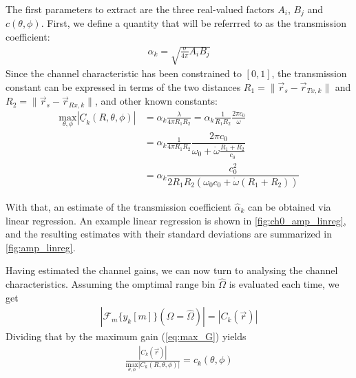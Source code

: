 The first parameters to extract are the three real-valued factors $A_i$, $B_j$ and $c(\theta,\phi)$.
First, we define a quantity that will be referrred to as the transmission coefficient:
\begin{align}
  \alpha_k = \sqrt{\frac{\sigma}{4\pi}A_iB_j}
\end{align}
Since the channel characteristic has been constrained to $[0,1]$,
the transmission constant can be expressed in terms of the two distances
$R_1 = \|\vec r_s - \vec r_{Tx,k}\|$ and $R_2 = \|\vec r_s - \vec r_{Rx,k}\|$, and other known constants: \\
\begin{align}
  \underset{\theta,\phi}{\text{max}} |\underline C_k(R,\theta,\phi)|
   & = \alpha_k\frac{\lambda}{4\pi R_1R_2} = \alpha_k \frac{1}{R_1R_2} \frac {2\pi c_0}{\omega}          \\
   & = \alpha_k \frac{1}{4\pi R_1R_2} \dfrac {2\pi c_0}{\omega_0 +  \dot \omega \frac{R_1+R_2}{c_0}}     \\
   & = \alpha_k \dfrac{c_0^2}{2R_1R_2\left(\omega_0c_0 +  \dot \omega (R_1+R_2)\right)} \label{eq:max_G}
\end{align}

With that, an estimate of the transmission coefficient $\hat \alpha_k$ can be obtained via linear regression.
An example linear regression is shown in \cref{fig:ch0_amp_linreg},
and the resulting estimates with their standard deviations are summarized in \cref{fig:amp_linreg}.

Having estimated the channel gains, we can now turn to analysing the channel characteristics.
Assuming the omptimal range bin $\hat \Omega$ is evaluated each time, we get
\begin{align*}
  \left|\mathcal{F}_m\{y_k[m]\}(\Omega = \hat \Omega)  \right| =  |C_k(\vec r)|
\end{align*}
Dividing that by the maximum gain (\ref{eq:max_G}) yields
\begin{align}
  \frac {|C_k(\vec r)|}{\underset{\theta,\phi}{\text{max}} |C_k(R,\theta,\phi)|}  = c_k(\theta,\phi)
\end{align}

